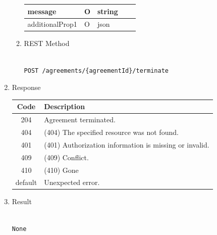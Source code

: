 \begin{enumerate}
\begin{enumerate}
\begin{table}[H]
\begin{center}
\begin{tabular}{|p{3cm}|l|p{3cm}|p{3cm}|p{4cm}|}
message			& O	& 	string				&		&	 	\\ 
\hline

additionalProp1	& O &	json				&		&		\\
\hline

\end{tabular}
\end{center}

\end{table}

\item REST Method

\begin{tcolorbox}[boxrule=0pt, frame empty]
\begin{verbatim} 

POST /agreements/{agreementId}/terminate

\end{verbatim}
\end{tcolorbox}

\end{enumerate}

\item Response

\begin{table}[H]
\footnotesize

\begin{center}
\begin{tabular}{|c|l|} 
\hline
\rowcolor{lightgray}	Code 		& 	Description \\
\hline
204	 		&	Agreement terminated. \\
\hline
404			&	(404) The specified resource was not found. \\
\hline
401			&	(401) Authorization information is missing or invalid. \\
\hline
409			&	(409) Conflict. \\
\hline
410			&	(410) Gone \\
\hline
default		&	Unexpected error. \\
\hline
\end{tabular}
\end{center}

\end{table}

\item Result

\begin{tcolorbox}[boxrule=0pt, frame empty]
\begin{verbatim}

None


\end{verbatim}
\end{tcolorbox}
\end{enumerate}
